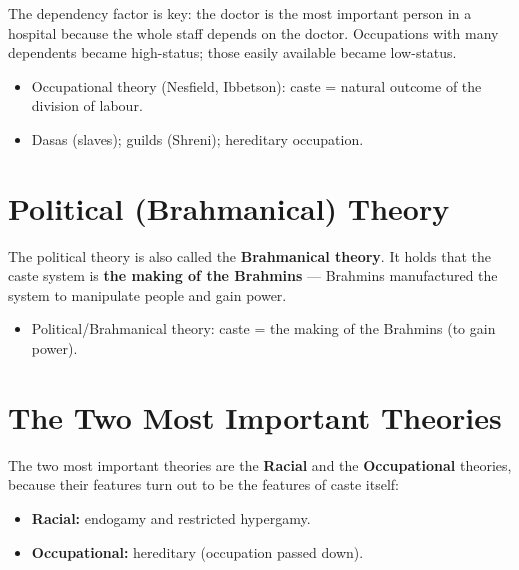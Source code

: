 \begin{ExampleBox}
The dependency factor is key: the doctor is the most important person in a hospital because the whole staff depends on the doctor. Occupations with many dependents became high-status; those easily available became low-status.
\end{ExampleBox}

\begin{QuickRevision}
\begin{itemize}
\item Occupational theory (Nesfield, Ibbetson): caste = natural outcome of the division of labour.
\item Dasas (slaves); guilds (Shreni); hereditary occupation.
\end{itemize}
\end{QuickRevision}

\section{Political (Brahmanical) Theory}

The political theory is also called the \textbf{Brahmanical theory}. It holds that the caste system is \textbf{the making of the Brahmins} --- Brahmins manufactured the system to manipulate people and gain power.

\begin{QuickRevision}
\begin{itemize}
\item Political/Brahmanical theory: caste = the making of the Brahmins (to gain power).
\end{itemize}
\end{QuickRevision}

\section{The Two Most Important Theories}

\begin{CriticalPoint}
The two most important theories are the \textbf{Racial} and the \textbf{Occupational} theories, because their features turn out to be the features of caste itself:
\begin{itemize}
\item \textbf{Racial:} endogamy and restricted hypergamy.
\item \textbf{Occupational:} hereditary (occupation passed down).
\end{itemize}
\end{CriticalPoint}

